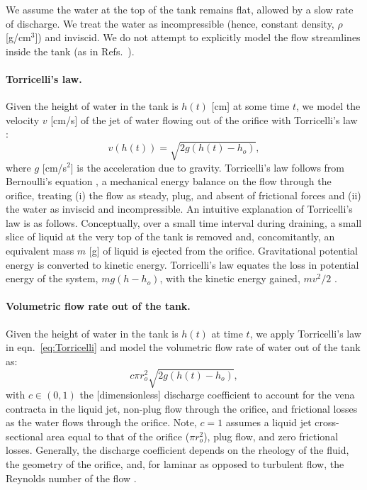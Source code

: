 \documentclass[openacc]{rsproca_new}%
\begin{document}
We assume the water at the top of the tank remains flat, allowed by a slow rate of discharge. We treat the water as incompressible (hence, constant density, $\rho$ [g/cm$^3$]) and inviscid. We do not attempt to explicitly model the flow streamlines inside the tank (as in Refs.~\cite{mathew2014numerical,sakri2017numerical}). 

\paragraph{Torricelli's law.}
Given the height of water in the tank is $h(t)$ [cm] at some time $t$, we model the velocity $v$ [cm/s] of the jet of water flowing out of the orifice with Torricelli's law \cite{d2021torricelli}:
\begin{equation}
	v\left(h(t) \right)=  \sqrt{2 g(h(t)-h_o)}, \label{eq:Torricelli}
\end{equation} where $g$ [cm/s$^2$] is the acceleration due to gravity. Torricelli's law follows from Bernoulli's equation \cite{welty2020fundamentals}, a mechanical energy balance on the flow through the orifice, treating (i) the flow as steady, plug, and absent of frictional forces and (ii) the water as inviscid and incompressible.
An intuitive explanation of Torricelli's law is as follows. 
Conceptually, over a small time interval during draining, a small slice of liquid at the very top of the tank is removed and, concomitantly, an equivalent mass $m$ [g] of liquid is ejected from the orifice.
Gravitational potential energy is converted to kinetic energy. 
Torricelli's law equates the loss in potential energy of the system, $m g(h-h_o)$, with the kinetic energy gained, $m v^2/2$ \cite{groetsch1993inverse,driver1998torricelli,williams2021vessel}. 

\paragraph{Volumetric flow rate out of the tank.} Given the height of water in the tank is $h(t)$ at time $t$, we apply Torricelli's law in eqn.~\ref{eq:Torricelli} and model the volumetric flow rate of water out of the tank as:
\begin{equation}
	c \pi r_o^2 \sqrt{2 g(h(t)-h_o)}, \label{eq:outletflow}
\end{equation}
with $c\in(0,1)$ the [dimensionless] discharge coefficient to account for the vena contracta in the liquid jet, non-plug flow through the orifice, and frictional losses as the water flows through the orifice. 
Note, $c=1$ assumes a liquid jet cross-sectional area equal to that of the orifice ($\pi r_o^2$), plug flow, and zero frictional losses.
Generally, the discharge coefficient depends on the rheology of the fluid, the geometry of the orifice, and, for laminar as opposed to turbulent flow, the Reynolds number of the flow \cite{teoman2022discharge}. 
\cite{horsch2020simple,teoman2022discharge,hicks2014determining,blasone2015discharge,lienhard1984velocity,wadhwa2021study}
\end{document}
